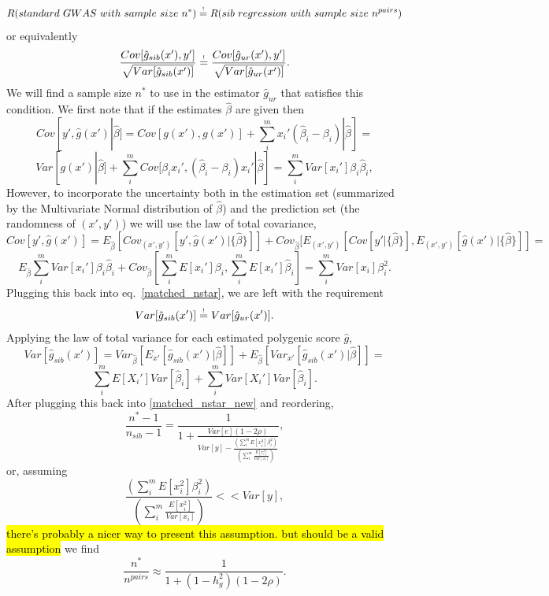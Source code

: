 \documentclass[hidelinks, 12pt]{article}
\begin{document}
$$R(standard~GWAS~with~sample~size~n^*) \reqeq R(sib~regression~with~sample~size~n^{pairs})$$
or equivalently
\begin{equation}
\label{matched_nstar}
\frac{Cov[\hat{g}_{sib}(x'),y']}{\sqrt{Var[\hat{g}_{sib}(x')]}} \reqeq \frac{Cov[\hat{g}_{ur}(x'),y']}{\sqrt{Var[\hat{g}_{ur}(x')]}}.
\end{equation}
We will find a sample size $n^*$ to use in the estimator $\hat{g}_{ur}$ that satisfies this condition.  We first note that if the estimates $\hat{\beta}$ are given then
$$ Cov[y',\hat{g}(x')|\hat{\beta}]=Cov[g(x'),g(x')]+\sum_i^m{x_i'(\hat{\beta}_i-\beta_i)}|\hat{\beta}] = $$
$$Var[g(x')|\hat{\beta}]+\sum_i^m{Cov[\beta_ix_i',(\hat{\beta}_i-\beta_i)x_i'}|\hat{\beta}]=\sum_i^mVar[x_i']\beta_i\hat{\beta}_i,$$
However, to incorporate the uncertainty both in the estimation set (summarized by the Multivariate Normal distribution of $\hat{\beta}$) and the prediction set (the randomness of $(x',y')$) we will use the law of total covariance,
$$ Cov[y',\hat{g}(x')]=E_{\hat{\beta}}[Cov_{(x',y')}[y',\hat{g}(x')|\{\hat{\beta}\}]]+Cov_{\hat{\beta}}[E_{(x',y')}[Cov[y'|\{\hat{\beta}\}],E_{(x',y')}[\hat{g}(x')|\{\hat{\beta}\}]]=$$
$$E_{\hat{\beta}}\sum_i^mVar[x_i']\beta_i\hat{\beta}_i+Cov_{\hat{\beta}}[\sum_i^mE[x_i']\beta_i,\sum_i^mE[x_i']\hat{\beta}_i]=\sum_i^mVar[x_i]\beta_i^2.$$
Plugging this back into eq.~\ref{matched_nstar}, we are left with the requirement 
\begin{equation}
\label{matched_nstar_new}
Var[\hat{g}_{sib}(x')] \reqeq Var[\hat{g}_{ur}(x')].
\end{equation}
Applying the law of total variance for each estimated polygenic score $\hat{g}$,
$$Var[\hat{g}_{sib}(x')] =Var_{\hat{\beta}}[E_{x'}[\hat{g}_{sib}(x')|\hat{\beta}]]+E_{\hat{\beta}}[Var_{x'}[\hat{g}_{sib}(x')|\hat{\beta}]] =$$
$$\sum_i^mE[X_i']Var[\hat{\beta}_i]+\sum_i^mVar[X_i']Var[\hat{\beta}_i].$$
After plugging this back into \ref{matched_nstar_new} and reordering, 
$$\frac{n^*-1}{n_{sib}-1}=\frac{1}{1+\frac{Var[e](1-2\rho)}{Var[y]-\frac{(\sum_i^mE[x_i^2]\beta_i^2)}{(\sum_i^m\frac{E[x_i^2]}{Var[x_i]})}}},$$
or, assuming 
$$\frac{(\sum_i^mE[x_i^2]\beta_i^2)}{(\sum_i^m\frac{E[x_i^2]}{Var[x_i]})} << Var[y],$$ 
\hl{there's probably a nicer way to present this assumption. but should be a valid assumption}
we find
\begin{equation}
\label{final_nstar_just_direct}
\frac{n^*}{n^{pairs}} \approx \frac{1}{1+(1-h_g^2)(1-2\rho)}.
\end{equation}
\end{document}
